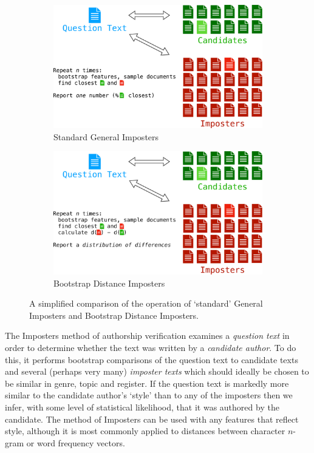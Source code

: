 \documentclass[
    hf
]{ceurart}
\begin{document}
\begin{figure}
    \centering
    \begin{subfigure}{.5\textwidth}
        \centering
        \includegraphics[width=0.93\linewidth]{figures/bdi_graphic_gi-crop.pdf}
        \caption*{Standard General Imposters}
    \end{subfigure}%
    \begin{subfigure}{.5\textwidth}
        \centering
        \includegraphics[width=0.93\linewidth]{figures/bdi_graphic_bdi-crop.pdf}
        \caption*{Bootstrap Distance Imposters}
    \end{subfigure}%
    \caption{A simplified comparison of the operation of `standard' General Imposters and
        Bootstrap Distance Imposters.}
    \label{fig:gibdi}
\end{figure}

The Imposters method of authorship verification examines a \emph{question text} in order to
determine whether the text was written by a \emph{candidate author}. To do this, it performs
bootstrap comparisons of the question text to candidate texts and several (perhaps very many)
\emph{imposter texts} which should ideally be chosen to be similar in genre, topic and register. If
the question text is markedly more similar to the candidate author's `style' than to any of the
imposters then we infer, with some level of statistical likelihood, that it was authored by the
candidate. The method of Imposters can be used with any features that reflect style, although it is
most commonly applied to distances between character $n$-gram or word frequency vectors.
\end{document}
